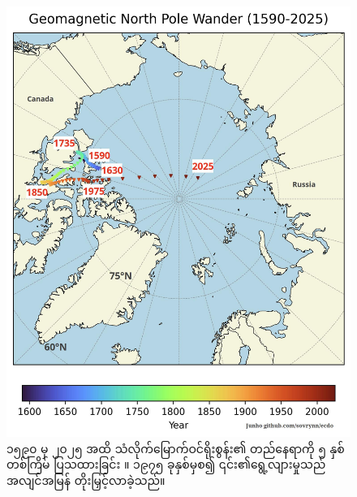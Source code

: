 \documentclass[10pt,twocolumn,letterpaper]{article}
\begin{document}
\begin{figure}[t]
\begin{center}
   \includegraphics[width=1\linewidth]{npw.jpg}
\end{center}
   \caption{၁၅၉၀ မှ ၂၀၂၅ အထိ သံလိုက်မြောက်ဝင်ရိုးစွန်း၏ တည်နေရာကို ၅ နှစ်တစ်ကြိမ် ပြသထားခြင်း \cite{41}။ ၁၉၇၅ ခုနှစ်မှစ၍ ၎င်း၏ရွေ့လျားမှုသည် အလျင်အမြန် တိုးမြှင့်လာခဲ့သည်။}
\label{fig:13}
\label{fig:onecol}
\end{figure}
\end{document}

